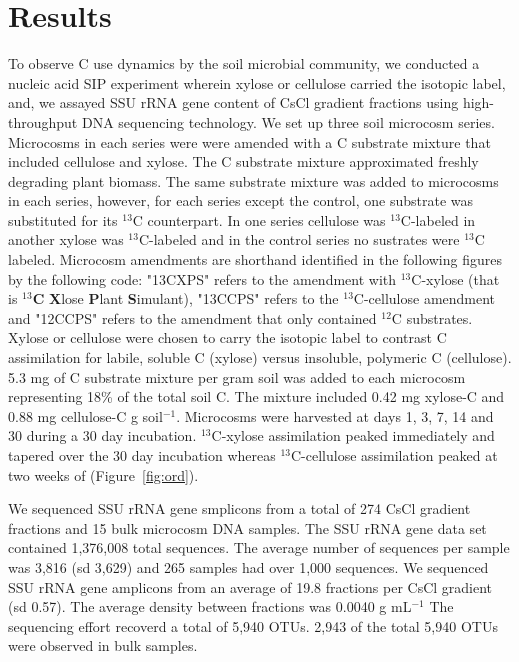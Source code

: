 \section{Results}
To observe C use dynamics by the soil microbial community, we conducted a
nucleic acid SIP experiment wherein xylose or cellulose carried the isotopic
label, and, we assayed SSU rRNA gene content of CsCl gradient fractions using
high-throughput DNA sequencing technology. We set up three soil microcosm series. 
Microcosms in each series were were amended with a C substrate mixture
that included cellulose and xylose. The C substrate mixture approximated
freshly degrading plant biomass. The same substrate mixture was added to microcosms
in each series, however, for each series except the control, one substrate
was substituted for its $^{13}$C counterpart. In one series cellulose was
$^{13}$C-labeled in another xylose was $^{13}$C-labeled and in the control
series no sustrates were $^{13}$C labeled. Microcosm amendments are shorthand identified
in the following figures by the following code: "13CXPS" refers to the
amendment with $^{13}$C-xylose (that is $^{13}$\textbf{C} \textbf{X}lose
\textbf{P}lant \textbf{S}imulant), "13CCPS" refers to the $^{13}$C-cellulose
amendment and "12CCPS" refers to the amendment that only contained $^{12}$C
substrates. Xylose or cellulose were chosen to carry the isotopic label to
contrast C assimilation for labile, soluble C (xylose) versus
insoluble, polymeric C (cellulose).  5.3 mg of C substrate mixture per gram
soil was added to each microcosm representing 18\% of the total soil C. The
mixture included 0.42 mg xylose-C and 0.88 mg cellulose-C g soil$^{-1}$.
Microcosms were harvested at days 1, 3, 7, 14 and 30  during a 30 day
incubation. $^{13}$C-xylose assimilation peaked immediately and tapered
over the 30 day incubation whereas $^{13}$C-cellulose assimilation peaked at
two weeks of (Figure~\ref{fig:ord}).

We sequenced SSU rRNA gene smplicons from a total of 274 CsCl gradient fractions and 
15 bulk microcosm DNA samples. The SSU rRNA gene data set contained 1,376,008 total sequences.
The average number of sequences per sample was 3,816 (sd 3,629) and 265 samples had over 1,000
sequences. We sequenced SSU rRNA gene amplicons from an average of 19.8 fractions per CsCl
gradient (sd 0.57). The average density between fractions was  0.0040 g mL$^{-1}$ 
The sequencing effort recoverd a total of 5,940 OTUs. 2,943 of the total
5,940 OTUs were observed in bulk samples.

